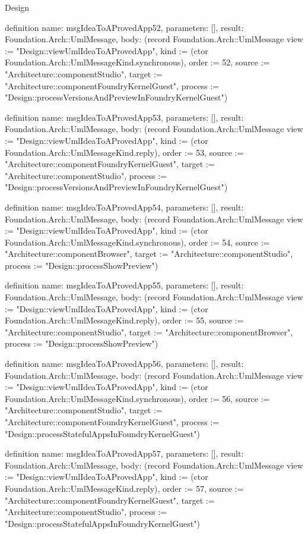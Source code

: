 \begin{lexlean}{Design}
\begin{semanticmodule}
definition{
  name: msgIdeaToAProvedApp52,
  parameters: [],
  result: Foundation.Arch::UmlMessage,
  body: (record Foundation.Arch::UmlMessage {view := "Design::viewUmlIdeaToAProvedApp", kind := (ctor Foundation.Arch::UmlMessageKind.synchronous), order := 52, source := "Architecture::componentStudio", target := "Architecture::componentFoundryKernelGuest", process := "Design::processVersionsAndPreviewInFoundryKernelGuest"})
}

definition{
  name: msgIdeaToAProvedApp53,
  parameters: [],
  result: Foundation.Arch::UmlMessage,
  body: (record Foundation.Arch::UmlMessage {view := "Design::viewUmlIdeaToAProvedApp", kind := (ctor Foundation.Arch::UmlMessageKind.reply), order := 53, source := "Architecture::componentFoundryKernelGuest", target := "Architecture::componentStudio", process := "Design::processVersionsAndPreviewInFoundryKernelGuest"})
}

definition{
  name: msgIdeaToAProvedApp54,
  parameters: [],
  result: Foundation.Arch::UmlMessage,
  body: (record Foundation.Arch::UmlMessage {view := "Design::viewUmlIdeaToAProvedApp", kind := (ctor Foundation.Arch::UmlMessageKind.synchronous), order := 54, source := "Architecture::componentBrowser", target := "Architecture::componentStudio", process := "Design::processShowPreview"})
}

definition{
  name: msgIdeaToAProvedApp55,
  parameters: [],
  result: Foundation.Arch::UmlMessage,
  body: (record Foundation.Arch::UmlMessage {view := "Design::viewUmlIdeaToAProvedApp", kind := (ctor Foundation.Arch::UmlMessageKind.reply), order := 55, source := "Architecture::componentStudio", target := "Architecture::componentBrowser", process := "Design::processShowPreview"})
}

definition{
  name: msgIdeaToAProvedApp56,
  parameters: [],
  result: Foundation.Arch::UmlMessage,
  body: (record Foundation.Arch::UmlMessage {view := "Design::viewUmlIdeaToAProvedApp", kind := (ctor Foundation.Arch::UmlMessageKind.synchronous), order := 56, source := "Architecture::componentStudio", target := "Architecture::componentFoundryKernelGuest", process := "Design::processStatefulAppsInFoundryKernelGuest"})
}

definition{
  name: msgIdeaToAProvedApp57,
  parameters: [],
  result: Foundation.Arch::UmlMessage,
  body: (record Foundation.Arch::UmlMessage {view := "Design::viewUmlIdeaToAProvedApp", kind := (ctor Foundation.Arch::UmlMessageKind.reply), order := 57, source := "Architecture::componentFoundryKernelGuest", target := "Architecture::componentStudio", process := "Design::processStatefulAppsInFoundryKernelGuest"})
}


\end{semanticmodule}
\end{lexlean}
